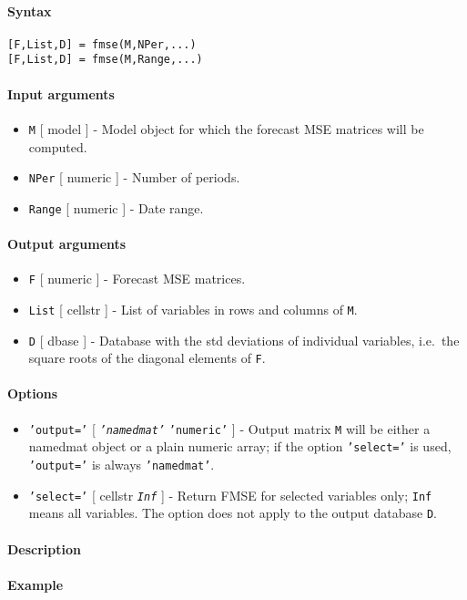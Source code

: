 


	\paragraph{Syntax}\label{syntax}

\begin{verbatim}
[F,List,D] = fmse(M,NPer,...)
[F,List,D] = fmse(M,Range,...)
\end{verbatim}

\paragraph{Input arguments}\label{input-arguments}

\begin{itemize}
\item
  \texttt{M} {[} model {]} - Model object for which the forecast MSE
  matrices will be computed.
\item
  \texttt{NPer} {[} numeric {]} - Number of periods.
\item
  \texttt{Range} {[} numeric {]} - Date range.
\end{itemize}

\paragraph{Output arguments}\label{output-arguments}

\begin{itemize}
\item
  \texttt{F} {[} numeric {]} - Forecast MSE matrices.
\item
  \texttt{List} {[} cellstr {]} - List of variables in rows and columns
  of \texttt{M}.
\item
  \texttt{D} {[} dbase {]} - Database with the std deviations of
  individual variables, i.e.~the square roots of the diagonal elements
  of \texttt{F}.
\end{itemize}

\paragraph{Options}\label{options}

\begin{itemize}
\item
  \texttt{'output='} {[} \emph{\texttt{'namedmat'}} \textbar{}
  \texttt{'numeric'} {]} - Output matrix \texttt{M} will be either a
  namedmat object or a plain numeric array; if the option
  \texttt{'select='} is used, \texttt{'output='} is always
  \texttt{'namedmat'}.
\item
  \texttt{'select='} {[} cellstr \textbar{} \emph{\texttt{Inf}} {]} -
  Return FMSE for selected variables only; \texttt{Inf} means all
  variables. The option does not apply to the output database
  \texttt{D}.
\end{itemize}

\paragraph{Description}\label{description}

\paragraph{Example}\label{example}


